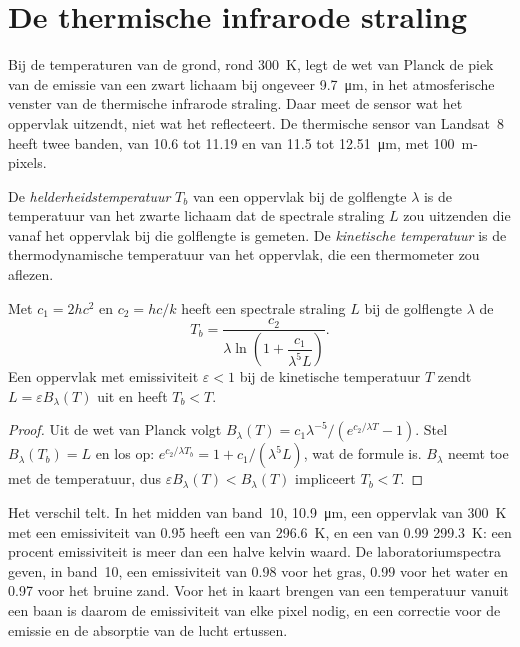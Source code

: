 \section{De thermische infrarode straling}\label{sec:b3:remote-sensing-gis:thermal}

Bij de temperaturen van de grond, rond \qty{300}{K}, legt de wet van Planck de piek van de
emissie van een zwart lichaam bij ongeveer \qty{9.7}{\micro\metre}, in het
atmosferische venster van de thermische infrarode straling. Daar meet de sensor wat
het oppervlak uitzendt, niet wat het reflecteert. De thermische sensor van Landsat~8
heeft twee banden, van 10.6 tot 11.19 en van 11.5 tot \qty{12.51}{\micro\metre}, met
\qty{100}{m}-pixels.

\begin{definition}[Helderheidstemperatuur]\label{def:b3:remote-sensing-gis:brightness}
De \emph{helderheidstemperatuur} $T_b$ van een
oppervlak bij de golflengte $\lambda$ is de temperatuur van het zwarte lichaam
dat de spectrale straling $L$ zou uitzenden die vanaf het oppervlak bij die
golflengte is gemeten. De \emph{kinetische temperatuur} is de thermodynamische
temperatuur van het oppervlak, die een thermometer zou aflezen.
\end{definition}

\begin{proposition}\label{prop:b3:remote-sensing-gis:planck-inversion}
Met $c_1 = 2hc^2$ en $c_2 = hc/k$ heeft een spectrale straling $L$ bij de
golflengte $\lambda$ de 
\[
T_b = \frac{c_2}{\lambda \ln\!\left(1 + \dfrac{c_1}{\lambda^5 L}\right)} .
\]
Een oppervlak met emissiviteit $\varepsilon < 1$ bij de kinetische temperatuur $T$
zendt $L = \varepsilon B_\lambda(T)$ uit en heeft $T_b < T$.
\end{proposition}

\begin{proof}
Uit de wet van Planck volgt $B_\lambda(T) = c_1\lambda^{-5}/(e^{c_2/\lambda T} -
1)$. Stel $B_\lambda(T_b) = L$ en los op: $e^{c_2/\lambda T_b} = 1 +
c_1/(\lambda^5L)$, wat de formule is. $B_\lambda$ neemt toe met de
temperatuur, dus $\varepsilon B_\lambda(T) < B_\lambda(T)$ impliceert $T_b < T$.
\end{proof}

Het verschil telt. In het midden van band~10, \qty{10.9}{\micro\metre},
een oppervlak van \qty{300}{K} met een emissiviteit van 0.95 heeft een 
van \qty{296.6}{K}, en een van 0.99 \qty{299.3}{K}: een procent
emissiviteit is meer dan een halve kelvin waard. De laboratoriumspectra geven,
in band~10, een emissiviteit van 0.98 voor het gras, 0.99 voor het water en
0.97 voor het bruine zand. Voor het in kaart brengen van een temperatuur vanuit een baan is daarom
de emissiviteit van elke pixel nodig, en een correctie voor de emissie en de
absorptie van de lucht ertussen.

